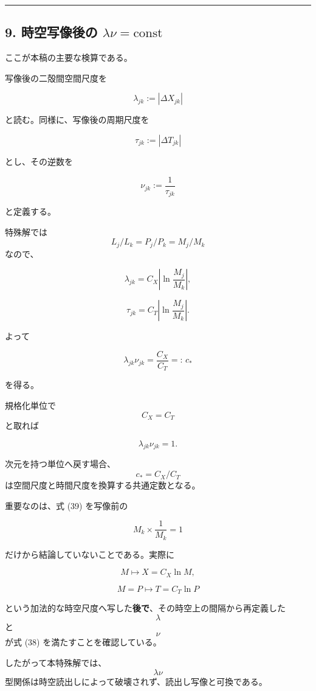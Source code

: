 \documentclass[
  a4paper,
]{ltjsarticle}
\begin{document}
\begin{center}\rule{0.5\linewidth}{0.5pt}\end{center}

\subsection{\texorpdfstring{9. 時空写像後の
\(\lambda\nu=\mathrm{const}\)}{9. 時空写像後の \textbackslash lambda\textbackslash nu=\textbackslash mathrm\{const\}}}\label{ux6642ux7a7aux5199ux50cfux5f8cux306e-lambdanumathrmconst}

ここが本稿の主要な検算である。

写像後の二殻間空間尺度を

\[
\boxed{
\lambda_{jk}
:=
|\Delta X_{jk}|
}
\tag{35}
\]

と読む。同様に、写像後の周期尺度を

\[
\boxed{
\tau_{jk}
:=
|\Delta T_{jk}|
}
\tag{36}
\]

とし、その逆数を

\[
\boxed{
\nu_{jk}
:=
\frac{1}{\tau_{jk}}
}
\tag{37}
\]

と定義する。

特殊解では \[L_j/L_k=P_j/P_k=M_j/M_k\] なので、

\[
\lambda_{jk}
=
C_X\left|\ln\frac{M_j}{M_k}\right|,
\]

\[
\tau_{jk}
=
C_T\left|\ln\frac{M_j}{M_k}\right|.
\]

よって

\[
\boxed{
\lambda_{jk}\nu_{jk}
=
\frac{C_X}{C_T}
=:\,c_*
}
\tag{38}
\]

を得る。

規格化単位で \[C_X=C_T\] と取れば

\[
\boxed{
\lambda_{jk}\nu_{jk}=1.
}
\tag{39}
\]

次元を持つ単位へ戻す場合、\[c_*=C_X/C_T\]
は空間尺度と時間尺度を換算する共通定数となる。

重要なのは、式 (39) を写像前の

\[
M_k\times\frac{1}{M_k}=1
\]

だけから結論していないことである。実際に

\[
M
\longmapsto
X=C_X\ln M,
\]

\[
M=P
\longmapsto
T=C_T\ln P
\]

という加法的な時空尺度へ写した\textbf{後で}、その時空上の間隔から再定義した
\[\lambda\] と \[\nu\] が式 (38) を満たすことを確認している。

したがって本特殊解では、\[\lambda\nu\]
型関係は時空読出しによって破壊されず、読出し写像と可換である。
\end{document}
